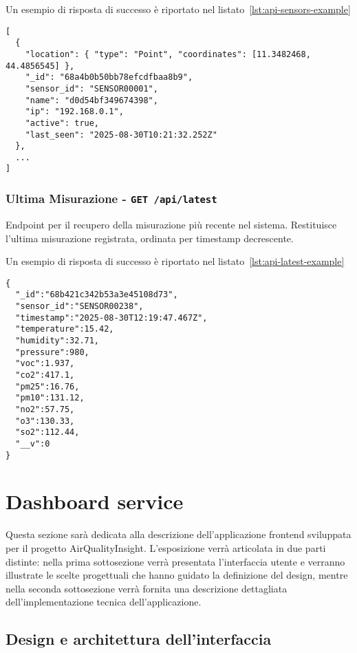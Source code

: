 Un esempio di risposta di successo è riportato nel listato~\ref{lst:api-sensors-example}
\begin{lstlisting}[caption={Risposta di sucesso per endpoint \texttt{sensors}},label=lst:api-sensors-example]
[
  {
    "location": { "type": "Point", "coordinates": [11.3482468, 44.4856545] },
    "_id": "68a4b0b50bb78efcdfbaa8b9",
    "sensor_id": "SENSOR00001",
    "name": "d0d54bf349674398",
    "ip": "192.168.0.1",
    "active": true,
    "last_seen": "2025-08-30T10:21:32.252Z"
  },
  ...
]
\end{lstlisting}

\subsubsection{Ultima Misurazione - \texttt{GET /api/latest}}

Endpoint per il recupero della misurazione più recente nel sistema.
Restituisce l'ultima misurazione registrata, ordinata per timestamp decrescente.

Un esempio di risposta di successo è riportato nel listato~\ref{lst:api-latest-example}
\begin{lstlisting}[caption={Risposta di sucesso per endpoint \texttt{latest}},label=lst:api-latest-example]
{
  "_id":"68b421c342b53a3e45108d73",
  "sensor_id":"SENSOR00238",
  "timestamp":"2025-08-30T12:19:47.467Z",
  "temperature":15.42,
  "humidity":32.71,
  "pressure":980,
  "voc":1.937,
  "co2":417.1,
  "pm25":16.76,
  "pm10":131.12,
  "no2":57.75,
  "o3":130.33,
  "so2":112.44,
  "__v":0
}
\end{lstlisting}

\section{Dashboard service}

Questa sezione sarà dedicata alla descrizione dell'applicazione frontend sviluppata per il progetto AirQualityInsight.
L'esposizione verrà articolata in due parti distinte: nella prima sottosezione verrà presentata
l'interfaccia utente e verranno illustrate le scelte progettuali che hanno guidato la definizione del design,
mentre nella seconda sottosezione verrà fornita una descrizione dettagliata dell'implementazione
tecnica dell'applicazione.

\subsection{Design e architettura dell'interfaccia}

